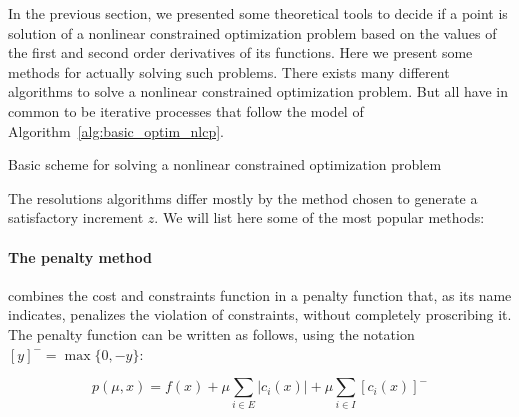 In the previous section, we presented some theoretical tools to decide if a point is solution of a nonlinear constrained optimization problem based on the values of the first and second order derivatives of its functions.
Here we present some methods for actually solving such problems.
There exists many different algorithms to solve a nonlinear constrained optimization problem.
But all have in common to be iterative processes that follow the model of Algorithm~\ref{alg:basic_optim_nlcp}.

\begin{algorithm}
\begin{algorithmic}
  \Repeat
\caption{Basic scheme for solving a nonlinear constrained optimization problem}
\label{alg:basic_optim_nlcp}
\end{algorithmic}
\end{algorithm}

The resolutions algorithms differ mostly by the method chosen to generate a satisfactory increment $z$. We will list here some of the most popular methods:

\paragraph{The penalty method} combines the cost and constraints function in a penalty function that, as its name indicates, penalizes the violation of constraints, without completely proscribing it.
The penalty function can be written as follows, using the notation ${[y]}^- = \max\{0, -y\}$:

\begin{equation}
  \label{penalty_function}
  p(\mu, x) = f(x) + \mu \sum_{i\in E}|c_i(x)| + \mu \sum_{i\in I} {[c_i(x)]}^-
\end{equation}

